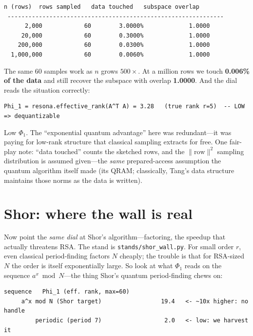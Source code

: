 \documentclass[11pt]{article}
\newcommand{\Phione}{$\Phi_1$}
\begin{document}
\begin{Verbatim}[fontsize=\small]
   n (rows)  rows sampled   data touched   subspace overlap
 --------------------------------------------------------------
      2,000            60        3.0000%             1.0000
     20,000            60        0.3000%             1.0000
    200,000            60        0.0300%             1.0000
  1,000,000            60        0.0060%             1.0000
\end{Verbatim}

The same 60 samples work as $n$ grows $500\times$. At a million rows we touch
\textbf{0.006\% of the data} and still recover the subspace with overlap
\textbf{1.0000}. And the dial reads the situation correctly:

\begin{Verbatim}[fontsize=\small]
Phi_1 = resona.effective_rank(A^T A) = 3.28   (true rank r=5)  -- LOW => dequantizable
\end{Verbatim}

Low \Phione. The ``exponential quantum advantage'' here was redundant---it was
paying for low-rank structure that classical sampling extracts for free. One
fair-play note: ``data touched'' counts the sketched rows, and the
$\lVert\text{row}\rVert^2$ sampling distribution is assumed given---the
\emph{same} prepared-access assumption the quantum algorithm itself made (its
QRAM; classically, Tang's data structure maintains those norms as the data is
written).

\section*{Shor: where the wall is real}

Now point the \emph{same dial} at Shor's algorithm---factoring, the speedup that
actually threatens RSA. The stand is \texttt{stands/shor\_wall.py}. For small order
$r$, even classical period-finding factors $N$ cheaply; the trouble is that for
RSA-sized $N$ the order is itself exponentially large. So look at what \Phione{}
reads on the sequence $a^x \bmod N$---the thing Shor's quantum period-finding chews
on:

\begin{Verbatim}[fontsize=\small]
                    sequence   Phi_1 (eff. rank, max=60)
     a^x mod N (Shor target)                 19.4   <- ~10x higher: no handle
         periodic (period 7)                  2.0   <- low: we harvest it
\end{Verbatim}
\end{document}
